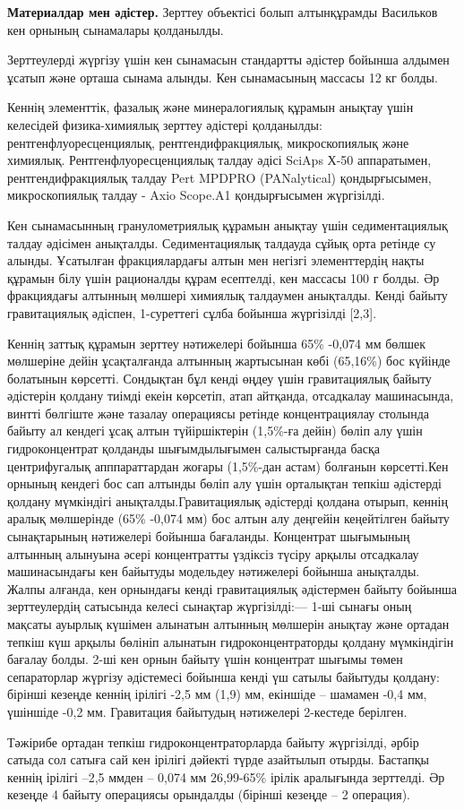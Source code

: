 \begin{multicols}{2}

{\bfseries Материалдар мен әдістер.} Зерттеу объектісі болып алтынқұрамды
Васильков кен орнының сынамалары қолданылды.

Зерттеулерді жүргізу үшін кен сынамасын стандартты әдістер бойынша
алдымен ұсатып және орташа сынама алынды. Кен сынамасының массасы 12 кг
болды.

Кеннің элементтік, фазалық және минералогиялық құрамын анықтау үшін
келесідей физика-химиялық зерттеу әдістері қолданылды:
рентгенфлуоресценциялық, рентгендифракциялық, микроскопиялық және
химиялық. Рентгенфлуоресценциялық талдау әдісі SciAps Х-50 аппаратымен,
рентгендифракциялық талдау Pert MPDPRO (PANalytical) қондырғысымен,
микроскопиялық талдау - Axio Scope.A1 қондырғысымен жүргізілді.

Кен сынамасынның гранулометриялық құрамын анықтау үшін седиментациялық
талдау әдісімен анықталды. Седиментациялық талдауда сұйық орта ретінде
су алынды. Ұсатылған фракциялардағы алтын мен негізгі элементтердің
нақты құрамын білу үшін рационалды құрам есептелді, кен массасы 100 г
болды. Әр фракциядағы алтынның мөлшері химиялық талдаумен анықталды.
Кенді байыту гравитациялық әдіспен, 1-суреттегі сұлба бойынша жүргізілді
{[}2,3{]}.

Кеннің заттық құрамын зерттеу нәтижелері бойынша 65\% -0,074 мм бөлшек
мөлшеріне дейін ұсақталғанда алтынның жартысынан көбі (65,16\%) бос
күйінде болатынын көрсетті. Сондықтан бұл кенді өңдеу үшін гравитациялық
байыту әдістерін қолдану тиімді екеін көрсетіп, атап айтқанда,
отсадкалау машинасында, винтті бөлгіште және тазалау операциясы ретінде
концентрациялау столында байыту ал кендегі ұсақ алтын түйіршіктерін
(1,5\%-ға дейін) бөліп алу үшін гидроконцентрат қолданды шығымдылығымен
салыстырғанда басқа центрифугалық апппараттардан жоғары (1,5\%-дан
астам) болғанын көрсетті.Кен орнының кендегі бос сап алтынды бөліп алу
үшін орталықтан тепкіш әдістерді қолдану мүмкіндігі
анықталды.Гравитациялық әдістерді қолдана отырып, кеннің аралық
мөлшерінде (65\% -0,074 мм) бос алтын алу деңгейін кеңейтілген байыту
сынақтарының нәтижелері бойынша бағаланды. Концентрат шығымының алтынның
алынуына әсері концентратты үздіксіз түсіру арқылы отсадкалау
машинасындағы кен байытуды модельдеу нәтижелері бойынша анықталды. Жалпы
алғанда, кен орнындағы кенді гравитациялық әдістермен байыту бойынша
зерттеулердің сатысында келесі сынақтар жүргізілді:--- 1-ші сынағы оның
мақсаты ауырлық күшімен алынатын алтынның мөлшерін анықтау және ортадан
тепкіш күш арқылы бөлініп алынатын гидроконцентраторды қолдану
мүмкіндігін бағалау болды. 2-ші кен орнын байыту үшін концентрат шығымы
төмен сепараторлар жүргізу әдістемесі бойынша кенді үш сатылы байытуды
қолдану: бірінші кезеңде кеннің ірілігі -2,5 мм (1,9) мм, екіншіде --
шамамен -0,4 мм, үшіншіде -0,2 мм. Гравитация байытудың нәтижелері
2-кестеде берілген.

Тәжірибе ортадан тепкіш гидроконцентраторларда байыту жүргізілді, әрбір
сатыда сол сатыға сай кен ірілігі дәйекті түрде азайтылып отырды.
Бастапқы кеннің ірілігі --2,5 ммден -- 0,074 мм 26,99-65\% ірілік
аралығында зерттелді. Әр кезеңде 4 байыту операциясы орындалды (бірінші
кезеңде -- 2 операция).
\end{multicols}

